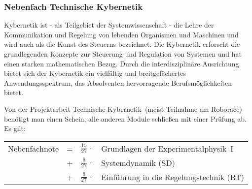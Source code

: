 \subsubsection{Nebenfach Technische Kybernetik}

Kybernetik ist - als Teilgebiet der Systemwissenschaft
- die Lehre der Kommunikation und Regelung
von lebenden Organismen und Maschinen und
wird auch als die Kunst des Steuerns bezeichnet.
Die Kybernetik erforscht die grundlegenden Konzepte
zur Steuerung und Regulation von Systemen und
hat einen starken mathematischen Bezug.
Durch die interdisziplinäre Ausrichtung
bietet sich der Kybernetik ein vielfältig und
breitgefächertes Anwendungsspektrum,
das Absolventen hervorragende Berufsmöglichkeiten bietet.



%
%
%

\begin{center}
\end{center}
Von der \glqq Projektarbeit Technische Kybernetik\grqq~(meist Teilnahme am Roborace) benötigt man einen Schein, alle anderen Module schließen mit einer Prüfung ab. Es gilt:\\[0.5ex]
\begin{tabular}{lcrl}
Nebenfachnote & = &$\frac{15}{27}\,\cdot$ &Grundlagen der Experimentalphysik~I\\[0.5ex]
              & + &$\frac{6}{27}\,\cdot$ &Systemdynamik (SD)\\[0.5ex]
              & + &$\frac{6}{27}\,\cdot$ &Einführung in die Regelungstechnik (RT)\\ 
\end{tabular}

